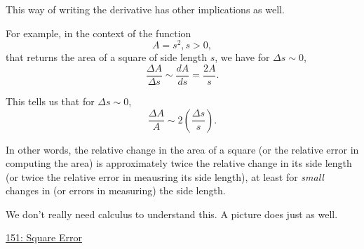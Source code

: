 \documentclass{ximera}
\begin{document}
This way of writing the derivative has other implications as well. 

For example, in the context of the function 
\[
    A = s^2 , s>0,
\]
that returns the area of a square of side length $s$, we have for $\Delta s\sim 0$,
\[
        \frac{\Delta A}{\Delta s} \sim \frac{dA}{ds} = \frac{2A}{s} .
\]

This tells us that for $\Delta s \sim 0$,
\[
    \frac{\Delta A}{A} \sim 2 \left( \frac{\Delta s}{s}  \right) .
\]

In other words, the relative change  in the area of a square (or the relative error in computing the area) is approximately twice the relative change in its side length  (or twice the relative error in meausring its side length), at least for \emph{small} changes in (or errors in measuring) the side length. 

We don't really need calculus to understand this. A picture does just as well.

\begin{onlineOnly}
    \begin{center}
\end{center}
\end{onlineOnly}

\href{https://www.desmos.com/calculator/h2fm6mm8ua}{151: Square Error}
\end{document}
